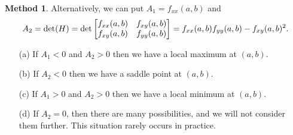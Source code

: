 \documentclass[reqno]{amsart}
\theoremstyle{definition}
\newtheorem{method}[theorem]{Method}
\begin{document}
\begin{method}\label{meth-hessian-entries}
 Alternatively, we can put $A_1=f_{xx}(a,b)$ and 
 \[ A_2 = \det(H)=
     \det\left[\begin{matrix} f_{xx}(a,b) & f_{xy}(a,b) \\
              f_{xy}(a,b) & f_{yy}(a,b) \end{matrix}\right] = 
    f_{xx}(a,b) f_{yy}(a,b) - f_{xy}(a,b)^2.
 \]
 \begin{itemize}
  \item[(a)] If $A_1<0$ and $A_2>0$ then we have a local maximum at
   $(a,b)$. 
  \item[(b)] If $A_2<0$ then we have a saddle point at $(a,b)$.
  \item[(c)] If $A_1>0$ and $A_2>0$ then we have a local minimum at
   $(a,b)$. 
  \item[(d)] If $A_2=0$, then there are many possibilities, and we
   will not consider them further.  This situation rarely occurs in
   practice. 
 \end{itemize}
\end{method}
\end{document}
